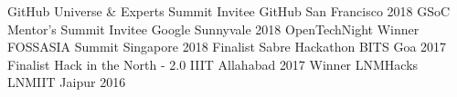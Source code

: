 \begin{cvhonors}
  \cvhonor
    {GitHub Universe \& Experts Summit Invitee}
    {GitHub}
    {San Francisco}
    {2018}
  \cvhonor
    {GSoC Mentor's Summit Invitee}
    {Google}
    {Sunnyvale}
    {2018}
  \cvhonor
    {OpenTechNight Winner}
    {FOSSASIA Summit}
    {Singapore}
    {2018}
  \cvhonor
    {Finalist}
    {Sabre Hackathon}
    {BITS Goa}
    {2017}
  \cvhonor
    {Finalist}
    {Hack in the North - 2.0}
    {IIIT Allahabad}
    {2017}
  \cvhonor
    {Winner}
    {LNMHacks}
    {LNMIIT Jaipur}
    {2016}
\end{cvhonors}
